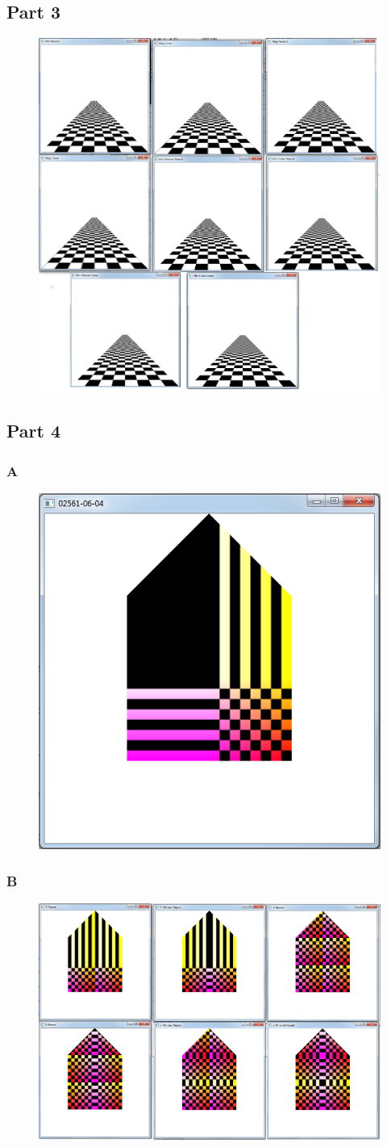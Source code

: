 \documentclass[11pt]{article}
\begin{document}
\subsection{Part 3}
\begin{figure}[H]
	\centering
	\includegraphics[width=0.5\linewidth]{images/e06p3}
	\label{fig:e06p3}
\end{figure}

\subsection{Part 4}
\subsubsection{A}
\begin{figure}[H]
	\centering
	\includegraphics[width=0.5\linewidth]{images/e06p4a}
	\label{fig:e06p4a}
\end{figure}

\subsubsection{B}
\begin{figure}[H]
	\centering
	\includegraphics[width=0.5\linewidth]{images/e06p4b}
	\label{fig:e06p4b}
\end{figure}
\end{document}
